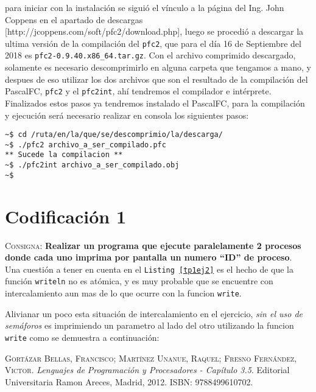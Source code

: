 \documentclass{article}
\begin{document}
para iniciar con la instalaci\'on se sigui\'o el v\'inculo a la p\'agina del Ing. John Coppens en el apartado de descargas [http://jcoppens.com/soft/pfc2/download.php], luego se procedi\'o a descargar la ultima versi\'on de la compilaci\'on del \texttt{pfc2}, que para el d\'ia 16 de Septiembre del 2018 es \texttt{pfc2-0.9.40.x86\_64.tar.gz}. Con el archivo comprimido descargado, solamente es necesario descomprimirlo en alguna carpeta que tengamos a mano, y despues de eso utilizar los dos archivos que son el resultado de la compilaci\'on del PascalFC, \texttt{pfc2} y el \texttt{pfc2int}, ah\'i tendremos el compilador e int\'erprete.\\

Finalizados estos pasos ya tendremos instalado el PascalFC, para la compilaci\'on y ejecuci\'on ser\'a necesario realizar en consola los siguientes pasos:

\begin{lstlisting}[caption={Compilaci\'on de y ejecuci\'on con pfc2}]
~$ cd /ruta/en/la/que/se/descomprimio/la/descarga/
~$ ./pfc2 archivo_a_ser_compilado.pfc
** Sucede la compilacion **
~$ ./pfc2int archivo_a_ser_compilado.obj
~$
\end{lstlisting}

\section{Codificaci\'on 1}
\textsc{Consigna}: \textbf{Realizar un programa que ejecute paralelamente 2 procesos donde cada uno imprima por pantalla un numero ``ID'' de proceso}.\\



Una cuesti\'on a tener en cuenta en el \texttt{Listing \ref{tp1ej2}} es  el hecho de que la funci\'on \texttt{writeln} no es at\'omica, y es muy probable que se encuentre con intercalamiento aun mas de lo que ocurre con la funcion \texttt{write}.

Alivianar un poco esta situaci\'on de intercalamiento en el ejercicio, \textit{sin el uso de sem\'aforos} es imprimiendo un parametro al lado del otro utilizando la funcion \texttt{write} como se demuestra a continuaci\'on:




\begin{thebibliography}{99}
	\textsc{Gort\'azar Bellas, Francisco; Mart\'inez Unanue, Raquel; Fresno Fern\'andez, Victor}. \textit{Lenguajes de Programaci\'on y Procesadores - Cap\'itulo 3.5}. Editorial Universitaria Ramon Areces, Madrid, 2012. \textsc{ISBN: 9788499610702}.
\end{thebibliography}
\end{document}

